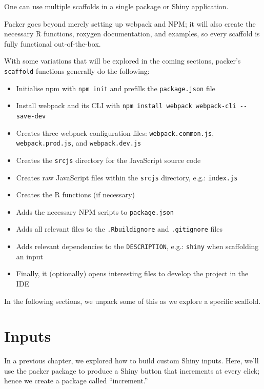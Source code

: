 \documentclass[10pt,]{krantz}
\makeatletter
\providecommand{\tightlist}{%
  \setlength{\itemsep}{0pt}\setlength{\parskip}{0pt}}
\newenvironment{kframe}{%
\medskip{}
\setlength{\fboxsep}{.8em}
 \def\at@end@of@kframe{}%
 \ifinner\ifhmode%
  \def\at@end@of@kframe{\end{minipage}}%
  \begin{minipage}{\columnwidth}%
 \fi\fi%
 \def\FrameCommand##1{\hskip\@totalleftmargin \hskip-\fboxsep
 \colorbox{shadecolor}{##1}\hskip-\fboxsep
     \hskip-\linewidth \hskip-\@totalleftmargin \hskip\columnwidth}%
 \MakeFramed {\advance\hsize-\width
   \@totalleftmargin\z@ \linewidth\hsize
   \@setminipage}}%
 {\par\unskip\endMakeFramed%
 \at@end@of@kframe}
\newenvironment{rmdblock}[1]
  {
  \begin{itemize}
  \renewcommand{\labelitemi}{
    \raisebox{-.7\height}[0pt][0pt]{
      {\setkeys{Gin}{width=3em,keepaspectratio}\texttt{[image: images/\#1]}}
    }
  }
  \setlength{\fboxsep}{1em}
  \begin{kframe}
  \item
  }
  {
  \end{kframe}
  \end{itemize}
  }
\newenvironment{rmdnote}
  {\begin{rmdblock}{note}}
  {\end{rmdblock}}
\makeatother
\begin{document}
\begin{rmdnote}
One can use multiple scaffolds in a single package or Shiny application.
\end{rmdnote}

Packer goes beyond merely setting up webpack and NPM; it will also create the necessary R functions, roxygen documentation, and examples, so every scaffold is fully functional out-of-the-box.

With some variations that will be explored in the coming sections, packer's \texttt{scaffold} functions generally do the following:

\begin{itemize}
\tightlist
\item
  Initialise npm with \texttt{npm\ init} and prefills the \texttt{package.json} file
\item
  Install webpack and its CLI with \texttt{npm\ install\ webpack\ webpack-cli\ -\/-save-dev}
\item
  Creates three webpack configuration files: \texttt{webpack.common.js}, \texttt{webpack.prod.js}, and \texttt{webpack.dev.js}
\item
  Creates the \texttt{srcjs} directory for the JavaScript source code
\item
  Creates raw JavaScript files within the \texttt{srcjs} directory, e.g.: \texttt{index.js}
\item
  Creates the R functions (if necessary)
\item
  Adds the necessary NPM scripts to \texttt{package.json}
\item
  Adds all relevant files to the \texttt{.Rbuildignore} and \texttt{.gitignore} files
\item
  Adds relevant dependencies to the \texttt{DESCRIPTION}, e.g.: \texttt{shiny} when scaffolding an input
\item
  Finally, it (optionally) opens interesting files to develop the project in the IDE
\end{itemize}

In the following sections, we unpack some of this as we explore a specific scaffold.

\hypertarget{packer-inputs}{%
\section{Inputs}\label{packer-inputs}}

In a previous chapter, we explored how to build custom Shiny inputs. Here, we'll use the packer package to produce a Shiny button that increments at every click; hence we create a package called ``increment.''
\end{document}
